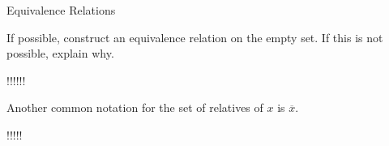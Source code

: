 \begin{section}{Equivalence Relations}
\begin{problem}
If possible, construct an equivalence relation on the empty set.  If this is not possible, explain why.
\end{problem}



!!!!!!

Another common notation for the set of relatives of $x$ is $\overline{x}$.

!!!!!

%
%
%
%
%
%
%


\end{section}
